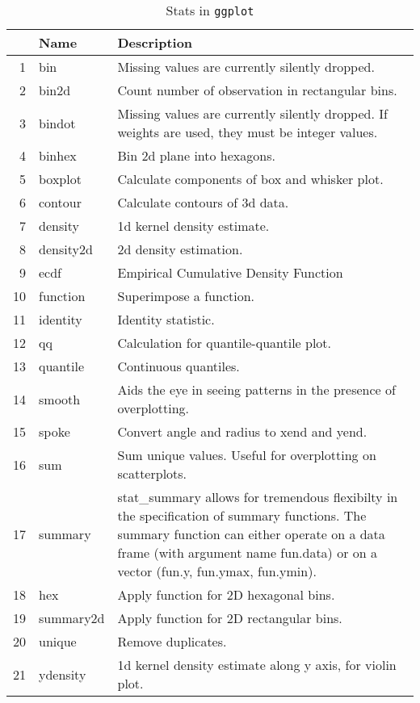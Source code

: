 \begin{table}[ht]
\centering
\begin{tabular}{rll}
  \hline
 & Name & Description \\ 
  \hline
1 & bin & Missing values are currently silently dropped. \\ 
  2 & bin2d & Count number of observation in rectangular bins. \\ 
  3 & bindot & Missing values are currently silently dropped. If weights are used, they must be integer values. \\ 
  4 & binhex & Bin 2d plane into hexagons. \\ 
  5 & boxplot & Calculate components of box and whisker plot. \\ 
  6 & contour & Calculate contours of 3d data. \\ 
  7 & density & 1d kernel density estimate. \\ 
  8 & density2d & 2d density estimation. \\ 
  9 & ecdf & Empirical Cumulative Density Function \\ 
  10 & function & Superimpose a function. \\ 
  11 & identity & Identity statistic. \\ 
  12 & qq & Calculation for quantile-quantile plot. \\ 
  13 & quantile & Continuous quantiles. \\ 
  14 & smooth & Aids the eye in seeing patterns in the presence of overplotting. \\ 
  15 & spoke & Convert angle and radius to xend and yend. \\ 
  16 & sum & Sum unique values. Useful for overplotting on scatterplots. \\ 
  17 & summary & stat\_summary allows for tremendous flexibilty in the specification of summary functions. The summary function can either operate on a data frame (with argument name fun.data) or on a vector (fun.y, fun.ymax, fun.ymin). \\ 
  18 & hex & Apply function for 2D hexagonal bins. \\ 
  19 & summary2d & Apply function for 2D rectangular bins. \\ 
  20 & unique & Remove duplicates. \\ 
  21 & ydensity & 1d kernel density estimate along y axis, for violin plot. \\ 
   \hline
\end{tabular}
\caption{Stats in \texttt{ggplot}} 
\label{stats}
\end{table}
